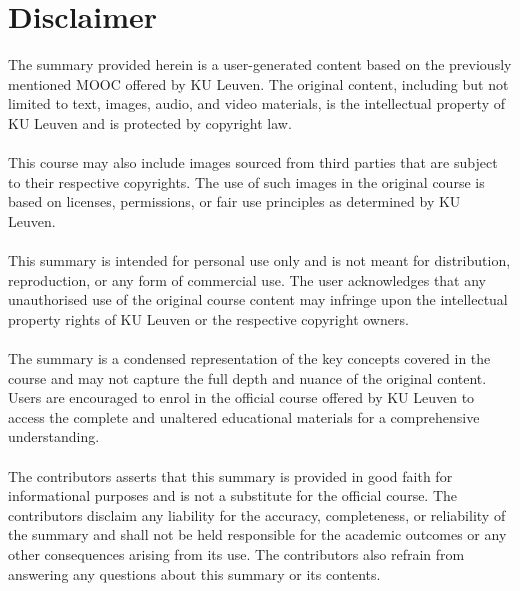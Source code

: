 \documentclass[kul]{kulakarticle} %
\begin{document}
\section*{Disclaimer}
The summary provided herein is a user-generated content based on the previously mentioned MOOC offered by KU Leuven. The original content, including but not limited to text, images, audio, and video materials, is the intellectual property of KU Leuven and is protected by copyright law.
\\\\
This course may also include images sourced from third parties that are subject to their respective copyrights. The use of such images in the original course is based on licenses, permissions, or fair use principles as determined by KU Leuven.
\\\\
This summary is intended for personal use only and is not meant for distribution, reproduction, or any form of commercial use. The user acknowledges that any unauthorised use of the original course content may infringe upon the intellectual property rights of KU Leuven or the respective copyright owners.
\\\\
The summary is a condensed representation of the key concepts covered in the course and may not capture the full depth and nuance of the original content. Users are encouraged to enrol in the official course offered by KU Leuven to access the complete and unaltered educational materials for a comprehensive understanding.
\\\\
The contributors asserts that this summary is provided in good faith for informational purposes and is not a substitute for the official course. The contributors disclaim any liability for the accuracy, completeness, or reliability of the summary and shall not be held responsible for the academic outcomes or any other consequences arising from its use. The contributors also refrain from answering any questions about this summary or its contents.
\newpage

\newpage
\setcounter{tocdepth}{2}
\tableofcontents
\newpage

\newpage

\newpage

\newpage

\newpage

\newpage

\newpage

\newpage

\newpage

\newpage

\newpage

\newpage

\newpage

\end{document}
